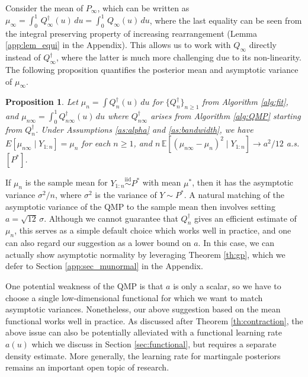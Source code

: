 \documentclass[11pt,a4paper]{article}
\newtheorem{proposition}{Proposition}%
\newcommand{\iid}{\overset{\mathrm{iid}}{\sim}}
\newcommand{\E}{\mathbb{E}}
\begin{document}
Consider the mean of $P_\infty$, which can be written as $
  \mu_\infty = \int_0^1 \, Q_\infty^{\dagger}(u) \, du = \int_0^1 \, Q_\infty(u) \, du$,
where the last equality can be seen from the integral preserving property of increasing rearrangement ({Lemma \ref{app:lem_equi}} in the Appendix). This allows us to work with $Q_\infty$ directly instead of $Q_\infty^{\dagger}$, where the latter is much more challenging due to its non-linearity.
The following proposition quantifies the posterior mean and asymptotic variance of $\mu_\infty$.
\begin{proposition}\label{prop:mu}
    Let $\mu_n = \int Q^{\dagger}_n(u) \, du$ for $\{Q^{\dagger}_n\}_{n \geq 1}$ from {Algorithm \ref{alg:fit}},  and $\mu_{n\infty} = \int_0^1 Q_{n\infty}^{\dagger}(u)\, du$ where $Q_{n\infty}^{\dagger}$ arises from {Algorithm \ref{alg:QMP}} starting from $Q^{\dagger}_n$. Under {Assumptions \ref{as:alpha}} and {\ref{as:bandwidth}}, we have $E[\mu_{n\infty} \mid Y_{1:n}] = \mu_n$  for each $n\geq 1$, and ${n}\, \E\left[\left(\mu_{n\infty} - \mu_n\right)^2\mid Y_{1:n}\right]\to {a^2}/{12}$ a.s.$[P^*]$.
\end{proposition}
If $\mu_n$ is the sample mean for $Y_{1:n} \iid P^*$ with mean $\mu^*$, then it has the asymptotic variance $\sigma^2/n$, where $\sigma^2$ is the variance of $Y \sim P^*$.
A natural matching of the asymptotic variance of the QMP to the sample mean then involves setting $a = \sqrt{12}\, \sigma$. Although we cannot guarantee that  $Q_n^{\dagger}$ gives an efficient estimate of $\mu_n$,  this serves as a simple default choice which works well in practice, and one can also regard our suggestion as a lower bound on $a$. In this case, we can actually show asymptotic normality by leveraging {Theorem \ref{th:gp}}, which we defer to Section \ref{app:sec_munormal} in the Appendix.



One potential weakness of the QMP is that $a$ is only a scalar, so we have to choose a single low-dimensional functional for which we want to match asymptotic variances. 
Nonetheless, our above suggestion based on the mean functional works well in practice. 
As discussed after {Theorem \ref{th:contraction}}, the above issue can also be potentially alleviated with a functional learning rate $a(u)$ which we discuss in Section \ref{sec:functional}, but requires a separate density estimate. More generally, the learning rate for martingale posteriors remains an important open topic of research.
 
\end{document}
